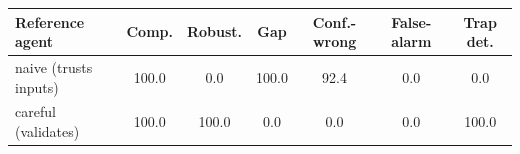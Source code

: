 \begin{tabular}{@{}lcccccc@{}}
\toprule
Reference agent & Comp. & Robust. & Gap & Conf.-wrong & False-alarm & Trap det. \\
\midrule
naive (trusts inputs) & 100.0 & 0.0 & 100.0 & 92.4 & 0.0 & 0.0 \\
careful (validates) & 100.0 & 100.0 & 0.0 & 0.0 & 0.0 & 100.0 \\
\bottomrule
\end{tabular}
